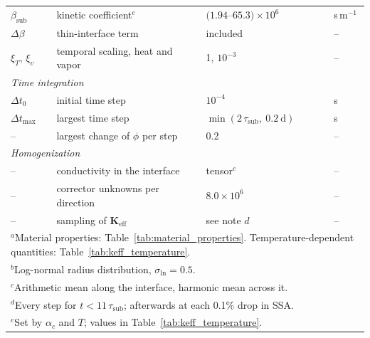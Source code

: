 {\begin{table}[htbp]
\begin{tabular}{l l l l}
 $\beta_{\mathrm{sub}}$ & kinetic coefficient$^{e}$ & $(1.94$--$65.3) \times 10^{6}$ & s\,m$^{-1}$ \\
 $\Delta\beta$ & thin-interface term & included & -- \\
 $\xi_T$, $\xi_v$ & temporal scaling, heat and vapor & 1, $10^{-3}$ & -- \\
 \multicolumn{4}{l}{\textit{Time integration}} \\
 $\Delta t_0$ & initial time step & $10^{-4}$ & s \\
 $\Delta t_{\max}$ & largest time step & $\min(2\,\tau_{\mathrm{sub}},\ 0.2\ \mathrm{d})$ & s \\
 -- & largest change of $\phi$ per step & 0.2 & -- \\
 \multicolumn{4}{l}{\textit{Homogenization}} \\
 -- & conductivity in the interface & tensor$^{c}$ & -- \\
 -- & corrector unknowns per direction & $8.0 \times 10^{6}$ & -- \\
 -- & sampling of $\mathbf{K}_{\mathrm{eff}}$ & see note $d$ & -- \\
\hline
\multicolumn{4}{l}{$^{a}$Material properties: Table~\ref{tab:material_properties}. Temperature-dependent quantities: Table~\ref{tab:keff_temperature}.} \\
\multicolumn{4}{l}{$^{b}$Log-normal radius distribution, $\sigma_{\ln} = 0.5$.} \\
\multicolumn{4}{l}{$^{c}$Arithmetic mean along the interface, harmonic mean across it.} \\
\multicolumn{4}{l}{$^{d}$Every step for $t < 11\,\tau_{\mathrm{sub}}$; afterwards at each 0.1\% drop in SSA.} \\
\multicolumn{4}{l}{$^{e}$Set by $\alpha_c$ and $T$; values in Table~\ref{tab:keff_temperature}.}
\end{tabular}
\label{tab:keff_parameters_full}
\end{table}
}

